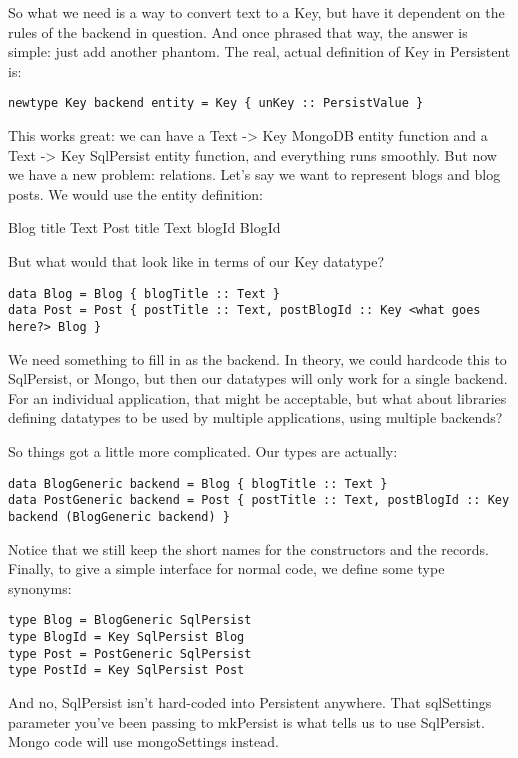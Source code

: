 So what we need is a way to convert text to a Key, but have it dependent on the rules of the backend in question. And once phrased that way, the answer is simple: just add another phantom. The real, actual definition of Key in Persistent is:

\begin{lstlisting}
newtype Key backend entity = Key { unKey :: PersistValue }
\end{lstlisting}

This works great: we can have a Text -> Key MongoDB entity function and a Text -> Key SqlPersist entity function, and everything runs smoothly. But now we have a new problem: relations. Let's say we want to represent blogs and blog posts. We would use the entity definition:

Blog
    title Text
Post
    title Text
    blogId BlogId

But what would that look like in terms of our Key datatype?

\begin{lstlisting}
data Blog = Blog { blogTitle :: Text }
data Post = Post { postTitle :: Text, postBlogId :: Key <what goes here?> Blog }
\end{lstlisting}

We need something to fill in as the backend. In theory, we could hardcode this to SqlPersist, or Mongo, but then our datatypes will only work for a single backend. For an individual application, that might be acceptable, but what about libraries defining datatypes to be used by multiple applications, using multiple backends?

So things got a little more complicated. Our types are actually:

\begin{lstlisting}
data BlogGeneric backend = Blog { blogTitle :: Text }
data PostGeneric backend = Post { postTitle :: Text, postBlogId :: Key backend (BlogGeneric backend) }
\end{lstlisting}

Notice that we still keep the short names for the constructors and the records. Finally, to give a simple interface for normal code, we define some type synonyms:

\begin{lstlisting}
type Blog = BlogGeneric SqlPersist
type BlogId = Key SqlPersist Blog
type Post = PostGeneric SqlPersist
type PostId = Key SqlPersist Post
\end{lstlisting}

And no, SqlPersist isn't hard-coded into Persistent anywhere. That sqlSettings parameter you've been passing to mkPersist is what tells us to use SqlPersist. Mongo code will use mongoSettings instead.

